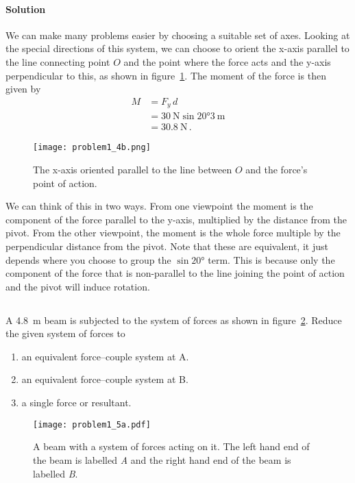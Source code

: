 \documentclass[a4paper,justified,oneside]{tufte-handout}
\numberwithin{equation}{subsection}
\begin{document}
\begin{solution}
\paragraph{Solution}
We can make many problems easier by choosing a suitable set of axes. Looking at the special directions of this system, we can choose to orient the x-axis parallel to the line connecting point $O$ and the point where the force acts and the y-axis perpendicular to this, as shown in figure~\ref{A1:fig:Q4b}. The moment of the force is then given by
\begin{align*}
	M	&=	F_y\, d	\\
		&=	\SI{30}{\N} \sin\ang{20} \SI{3}{\m}\\
		&=	\SI{30.8}{\N} \,.
\end{align*}
\begin{figure}
	\centering
	\texttt{[image: problem1\_4b.png]}
	\caption{The x-axis oriented parallel to the line between $O$ and the force's point of action.}
	\label{A1:fig:Q4b}
\end{figure}
We can think of this in two ways. From one viewpoint the moment is the component of the force parallel to the y-axis, multiplied by the distance from the pivot. From the other viewpoint, the moment is the whole force multiple by the perpendicular distance from the pivot. Note that these are equivalent, it just depends where you choose to group the $\sin\ang{20}$ term. This is because only the component of the force that is non-parallel to the line joining the point of action and the pivot will induce rotation.
\clearpage
\end{solution}

\subsection{}\label{A1:sec:equivalentForceCouple1}
A \SI{4.8}{\m} beam is subjected to the system of forces as shown in figure~\ref{A1:fig:Q5a}. Reduce the given system of forces to 
\begin{enumerate}
	\item an equivalent force--couple system at A.
	\item an equivalent force--couple system at B.
	\item a single force or resultant.
\end{enumerate}
\begin{figure}
	\centering
	\texttt{[image: problem1\_5a.pdf]}
	\caption{A beam with a system of forces acting on it. The left hand end of the beam is labelled \emph{A} and the right hand end of the beam is labelled \emph{B}.}
	\label{A1:fig:Q5a}
\end{figure}
\end{document}
